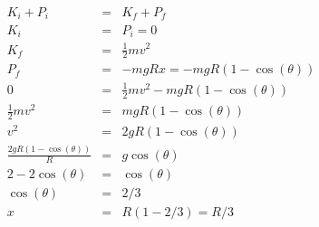 \documentclass[11pt]{amsart}
\begin{document}
\begin{eqnarray*}
K_{i}+P_{i} &=& K_{f} +P_{f} \\
K_{i} &=& P_{i} = 0 \\
K_{f} &=& \frac{1}{2}mv^{2} \\
P_{f} &=& -mgRx = -mgR(1-\cos(\theta)) \\
0 &=&  \frac{1}{2}mv^{2}-mgR(1-\cos(\theta)) \\
\frac{1}{2}mv^{2} &=& mgR(1-\cos(\theta)) \\
v^{2} &=& 2gR(1-\cos(\theta)) \\
\frac{ 2gR(1-\cos(\theta))}{R} &=& g\cos(\theta) \\
2-2\cos(\theta) &=& \cos(\theta) \\
\cos(\theta) &=& 2/3 \\
x &=& R(1-2/3) = R/3 
\end{eqnarray*} \\ 
\end{document}
